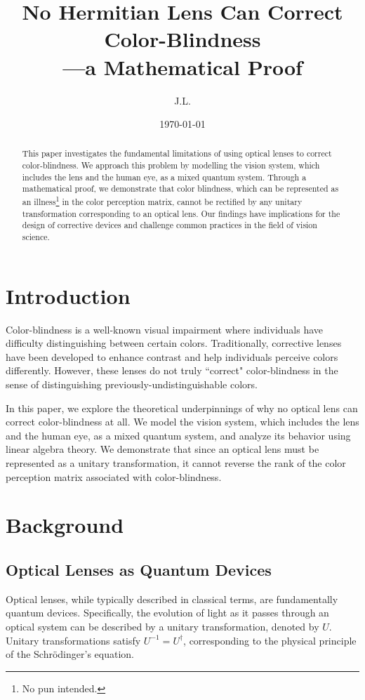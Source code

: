\documentclass[10pt,a4paper]{article}
\title{No Hermitian Lens Can Correct Color-Blindness\\---a Mathematical Proof}
\author{J.L.}
\date{\today}
\theoremstyle{definition}
\theoremstyle{remark}
\numberwithin{equation}{section}
\begin{document}
\maketitle

\begin{abstract}
This paper investigates the fundamental limitations of using optical lenses to correct color-blindness. We approach this problem by modelling the vision system, which includes the lens and the human eye, as a mixed quantum system. Through a mathematical proof, we demonstrate that color blindness, which can be represented as an illness\footnote{No pun intended.} in the color perception matrix, cannot be rectified by any unitary transformation corresponding to an optical lens. Our findings have implications for the design of corrective devices and challenge common practices in the field of vision science.
\end{abstract}

\section{Introduction}
Color-blindness is a well-known visual impairment where individuals have difficulty distinguishing between certain colors. Traditionally, corrective lenses have been developed to enhance contrast and help individuals perceive colors differently. However, these lenses do not truly ``correct" color-blindness in the sense of distinguishing previously-undistinguishable colors. 

In this paper, we explore the theoretical underpinnings of why no optical lens can correct color-blindness at all. We model the vision system, which includes the lens and the human eye, as a mixed quantum system, and analyze its behavior using linear algebra theory. We demonstrate that since an optical lens must be represented as a unitary transformation, it cannot reverse the rank of the color perception matrix associated with color-blindness.

\section{Background}
\subsection{Optical Lenses as Quantum Devices}
Optical lenses, while typically described in classical terms, are fundamentally quantum devices. Specifically, the evolution of light as it passes through an optical system can be described by a unitary transformation, denoted by \( U \). Unitary transformations satisfy  \( U^{-1}= U^\dagger \), corresponding to the physical principle of the Schr\"{o}dinger's equation.
\end{document}
